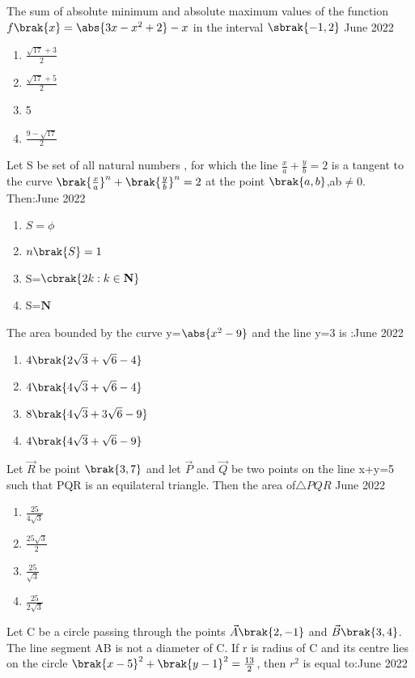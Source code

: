\bigskip
\item The sum of absolute minimum and absolute maximum values of the function$f\brak{x}=\abs{3x-x^2+2}-x$ in the interval $\sbrak{-1,2}$ \hfill{June 2022}
\begin{enumerate}
    \item $\frac{\sqrt{17}+3}{2}$
    \item $\frac{\sqrt{17}+5}{2}$
    \item 5
    \item $\frac{9-\sqrt{17}}{2}$
\end{enumerate}
\bigskip
\item Let S be set of all natural numbers , for which the line $\frac{x}{a}+\frac{y}{b}=2$ is a tangent to the curve $\brak{\frac{x}{a}}^{n}+\brak{\frac{y}{b}}^{n}=2$ at the point $\brak{a,b}$,ab$\neq$0. Then:\hfill{June 2022}
\begin{enumerate}
    \item $S=\phi$
    \item $n\brak{S}=1$
    \item S=$\cbrak{2k:k\in\mathbf{N}}$
    \item S=$\mathbf{N}$
\end{enumerate}
\bigskip
\item The area bounded by the curve y=$\abs{x^2-9}$ and the line y=3 is :\hfill{June 2022}
\begin{enumerate}
    \item $4\brak{2\sqrt{3}+\sqrt{6}-4}$
    \item $4\brak{4\sqrt{3}+\sqrt{6}-4}$
    \item $8\brak{4\sqrt{3}+3\sqrt{6}-9}$
    \item $4\brak{4\sqrt{3}+\sqrt{6}-9}$
\end{enumerate}
\bigskip
\item Let $\vec{R}$ be point $\brak{3,7}$ and let $\vec{P}$ and $\vec{Q}$ be two points on the line x+y=5 such that PQR is an equilateral triangle. Then the area of$\triangle PQR$ \hfill{June 2022}
\begin{enumerate}
    \item $\frac{25}{4\sqrt{3}}$
    \item $\frac{25\sqrt{3}}{2}$
    \item $\frac{25}{\sqrt{3}}$
    \item $\frac{25}{2\sqrt{3}}$
\end{enumerate}
\bigskip
\item Let C be a circle passing through the points $\vec{A}\brak{2,-1}$ and $\vec{B}\brak{3,4}$. The line segment AB is not a diameter of C. If r is  radius of C and its centre lies on the circle $\brak{x-5}^2+\brak{y-1}^2=\frac{13}{2}$, then $r^2$ is equal to:\hfill{June 2022}
